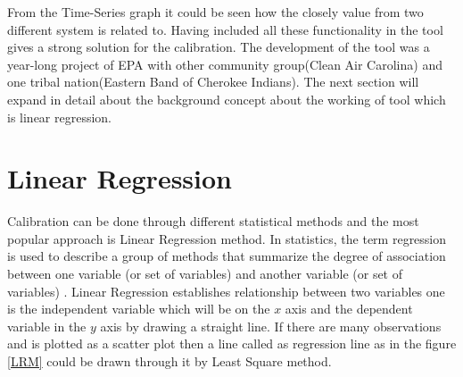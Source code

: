 From the Time-Series graph it could be seen how the closely value from two different system is related to.
Having included all these functionality in the tool gives a strong solution for the calibration. The development of the tool was a year-long project of EPA with other community group(Clean Air
Carolina) and  one tribal nation(Eastern Band of Cherokee Indians). The next section will expand in detail about the background concept about the working of tool which is linear regression.

\section{Linear Regression}

Calibration can be done through different statistical methods and the most popular approach is Linear Regression method. In statistics, the term regression is used to describe a group of methods that summarize the degree of association between one variable (or set of variables) and another variable (or set of variables) \cite{Burke}. Linear Regression establishes relationship between two variables one is the independent variable which will be on the $x$ axis and the dependent variable in the $y$ axis by drawing a straight line.
If there are many observations and is plotted as a scatter plot then a line called as regression line as in the figure \ref{LRM} could be drawn through it by Least Square method. 


